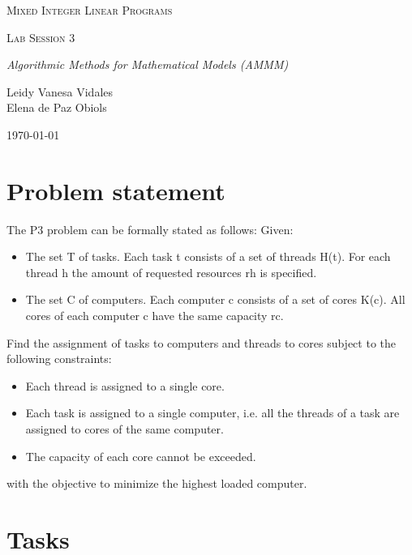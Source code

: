 \documentclass{article}
\begin{document}
\begin{titlepage}
\centering
\vspace*{7cm}
{\scshape\Huge Mixed Integer Linear Programs \par}
\vspace{1cm}
{\scshape\Large Lab Session 3 \par}
\vspace{1cm}
{\itshape\Large Algorithmic Methods for Mathematical Models (AMMM) \par}
\vspace{8cm}
{\Large Leidy Vanesa Vidales \\ Elena de Paz Obiols \par}
\vspace*{0.5cm}
{\Large \today \par}
\end{titlepage}
\vspace*{0.5cm}

\tableofcontents
\newpage
\section{Problem statement}

The P3 problem can be formally stated as follows:
Given:
\begin{itemize}
\item The set T of tasks. Each task t consists of a set of threads H(t). For each thread h the amount of requested resources rh is specified.
\item The set C of computers. Each computer c consists of a set of cores K(c). All cores of each computer c have the same capacity rc.
\end{itemize}
Find the assignment of tasks to computers and threads to cores subject to the following constraints:
\begin{itemize}
\item Each thread is assigned to a single core.
\item Each task is assigned to a single computer, i.e. all the threads of a task are assigned to cores of the same computer.
\item The capacity of each core cannot be exceeded.
\end{itemize}
with the objective to minimize the highest loaded computer.

\newpage
\section{Tasks}
\end{document}
